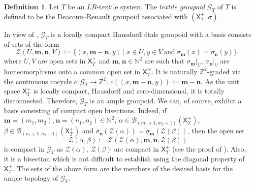 \documentclass[a4paper,reqno,12pt]{amsart}
\newcommand{\Zz}{\mathcal{Z}}
\newcommand{\N}{\mathbf{n}}
\newcommand{\M}{\mathbf{m}}
\newcommand{\Xs}{\mathsf{X}}
\theoremstyle{definition}
\newtheorem{dfn}[thm]{Definition}
\theoremstyle{remark}
\begin{document}
\begin{dfn}\label{def the textile groupoid}
Let $T$ be an $LR$-textile system. The \emph{textile groupoid} $\mathcal{G}_T$ of $T$ is defined to be the Deaconu--Renault groupoid associated with $(\Xs_T^+,\sigma)$.    
\end{dfn}
In view of \cite[Lemma 3.1]{Sims}, $\mathcal{G}_T$ is a locally compact Hausdorff \'{e}tale groupoid with a basis consists of sets of the form \[\Zz(U,\mathbf{m},\mathbf{n},V):=\{(x,\mathbf{m}-\mathbf{n},y)~|~x\in U,y\in V~\text{and}~\sigma_\M (x)=\sigma_\N (y)\},\] where $U,V$ are open sets in $\Xs_T^+$ and $\M,\N\in \mathbb{N}^2$ are such that $\sigma_\M|_U$, $\sigma_\N|_V$ are homeomorphisms onto a common open set in $\Xs_T^+$. It is naturally $\mathbb{Z}^2$-graded via the continuous cocycle $c:\mathcal{G}_T\longrightarrow \mathbb{Z}^2$; $c((x,\M-\N,y)):=\M-\N$. As the unit space $\Xs_T^+$ is locally compact, Hausdorff and zero-dimensional, it is totally disconnected. Therefore, $\mathcal{G}_T$ is an ample groupoid. We can, of course, exhibit a basis consisting of compact open bisections. Indeed, if $\M=(m_1,m_2),\N=(n_1,n_2)\in \mathbb{N}^2$, $\alpha\in \mathcal{B}_{(m_1+1,m_2+1)}(\Xs_T^+)$, $\beta\in \mathcal{B}_{(n_1+1,n_2+1)}(\Xs_T^+)$ and $\sigma_\N(\Zz(\alpha))=\sigma_\M(\Zz(\beta))$, then the open set \[\Zz(\alpha,\beta):=\Zz(\Zz(\alpha),\M,\N,\Zz(\beta))\] is compact in $\mathcal{G}_T$ as $\Zz(\alpha)$, $\Zz(\beta)$ are compact in $\Xs_T^+$ (see the proof of \cite[Lemma 3.1]{Sims}). Also, it is a bisection which is not difficult to establish using the diagonal property of $\Xs_T^+$. The sets of the above form are the members of the desired basis for the ample topology of $\mathcal{G}_T$. 
\end{document}
